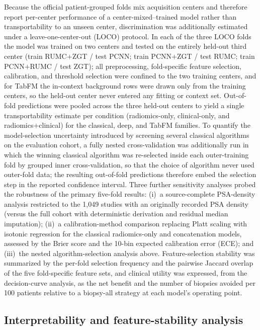\documentclass[11pt]{article}
\begin{document}
Because the official patient-grouped folds mix acquisition centers and therefore
report per-center performance of a center-mixed--trained model rather than
transportability to an unseen center, discrimination was additionally estimated
under a leave-one-center-out (LOCO) protocol. In each of the three LOCO folds the
model was trained on two centers and tested on the entirely held-out third center
(train RUMC$+$ZGT / test PCNN; train PCNN$+$ZGT / test RUMC; train PCNN$+$RUMC /
test ZGT); all preprocessing, fold-specific feature selection, calibration, and
threshold selection were confined to the two training centers, and for TabFM the
in-context background rows were drawn only from the training centers, so the
held-out center never entered any fitting or context set. Out-of-fold predictions
were pooled across the three held-out centers to yield a single transportability
estimate per condition (radiomics-only, clinical-only, and radiomics$+$clinical) for
the classical, deep, and TabFM families. To quantify the model-selection
uncertainty introduced by screening several classical algorithms on the evaluation
cohort, a fully nested cross-validation was additionally run in which the winning
classical algorithm was re-selected inside each outer-training fold by grouped inner
cross-validation, so that the choice of algorithm never used outer-fold data; the
resulting out-of-fold predictions therefore embed the selection step in the reported
confidence interval. Three further sensitivity analyses probed
the robustness of the primary five-fold results: (i)~a source-complete PSA-density
analysis restricted to the 1{,}049 studies with an originally recorded PSA density
(versus the full cohort with deterministic derivation and residual median
imputation); (ii)~a calibration-method comparison replacing Platt scaling with
isotonic regression for the classical radiomics-only and concatenation models,
assessed by the Brier score and the 10-bin expected calibration error (ECE); and
(iii)~the nested algorithm-selection analysis above.
Feature-selection stability was summarized by the per-fold selection frequency and
the pairwise Jaccard overlap of the five fold-specific feature sets, and clinical
utility was expressed, from the decision-curve analysis, as the net benefit and the
number of biopsies avoided per 100 patients relative to a biopsy-all strategy at
each model's operating point.

\subsection{Interpretability and feature-stability analysis}
\label{sec:interpret-methods}
\end{document}
